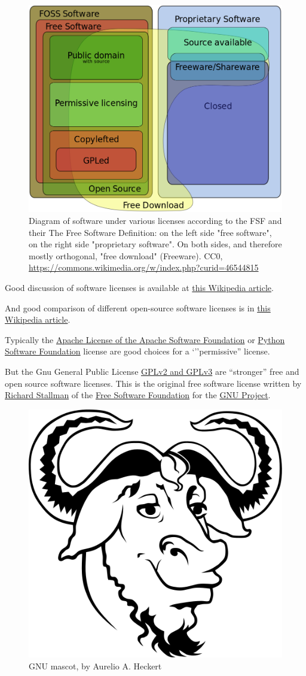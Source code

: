 \documentclass[10pt]{article} %
\begin{document}
    \begin{figure}[h]
      \centering
      \includegraphics[width=0.5\linewidth]{figs/Software_Categories_expanded}
      \caption{Diagram of software under various licenses according to the FSF and their The Free Software Definition: on the left side "free software", on the right side "proprietary software". On both sides, and therefore mostly orthogonal, "free download" (Freeware). CC0, \href{https://commons.wikimedia.org/w/index.php?curid=46544815}{https://commons.wikimedia.org/w/index.php?curid=46544815}}
      \label{fig:software-licenses}
    \end{figure}

    Good discussion of software licenses is available at \href{https://en.wikipedia.org/wiki/Software_license}{this Wikipedia article}.

    And good comparison of different open-source software licenses is in \href{https://en.wikipedia.org/wiki/Comparison_of_free_and_open-source_software_licenses}{this Wikipedia article}.

    Typically the \href{https://en.wikipedia.org/wiki/Apache_License}{Apache License of the Apache Software Foundation} or \href{https://en.wikipedia.org/wiki/Python_Software_Foundation_License}{Python Software Foundation} license are good choices for a `''permissive'' license.

    But the Gnu General Public License \href{https://en.wikipedia.org/wiki/GNU_General_Public_License}{GPLv2 and GPLv3}  are ``stronger'' free and open source software licenses. This is the original free software license written by \href{https://en.wikipedia.org/wiki/Richard_Stallman}{Richard Stallman}  of the \href{https://en.wikipedia.org/wiki/Free_Software_Foundation}{Free Software Foundation} for the \href{https://en.wikipedia.org/wiki/GNU_Project}{GNU Project}.

      \begin{figure}[h]
        \centering
        \includegraphics[width=0.25\linewidth]{figs/Heckert_GNU_white}
        \caption{GNU mascot, by Aurelio A. Heckert}
        \label{fig:gnu-mascot}
      \end{figure}
\end{document}
